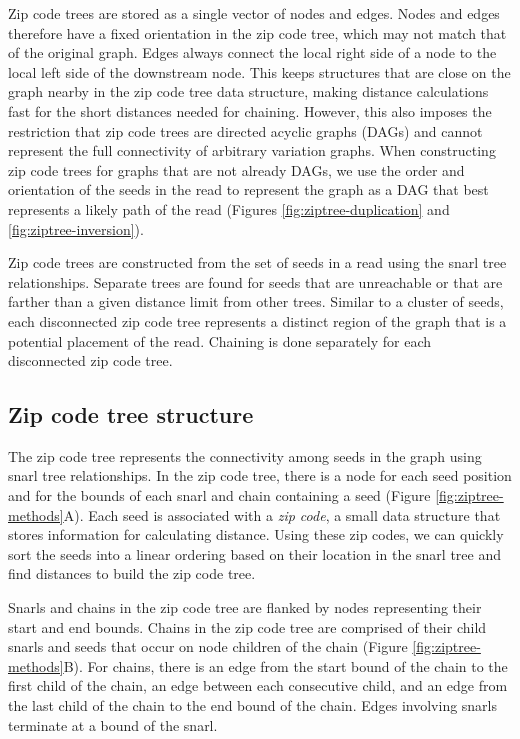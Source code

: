 \documentclass[11pt]{ucscthesis}
\begin{document}
Zip code trees are stored as a single vector of nodes and edges.
Nodes and edges therefore have a fixed orientation in the zip code tree, which may not match that of the original graph.
Edges always connect the local right side of a node to the local left side of the downstream node.
This keeps structures that are close on the graph nearby in the zip code tree data structure, making distance calculations fast for the short distances needed for chaining.
However, this also imposes the restriction that zip code trees are directed acyclic graphs (DAGs) and cannot represent the full connectivity of arbitrary variation graphs.
When constructing zip code trees for graphs that are not already DAGs, we use the order and orientation of the seeds in the read to represent the graph as a DAG that best represents a likely path of the read (Figures  \ref{fig:ziptree-duplication} and \ref{fig:ziptree-inversion}).

Zip code trees are constructed from the set of seeds in a read using the snarl tree relationships.
Separate trees are found for seeds that are unreachable or that are farther than a given distance limit from other trees.
Similar to a cluster of seeds, each disconnected zip code tree represents a distinct region of the graph that is a potential placement of the read.
Chaining is done separately for each disconnected zip code tree.


\subsection{Zip code tree structure}

The zip code tree represents the connectivity among seeds in the graph using snarl tree relationships.
In the zip code tree, there is a node for each seed position and for the bounds of each snarl and chain containing a seed (Figure \ref{fig:ziptree-methods}A).
Each seed is associated with a \emph{zip code}, a small data structure that stores information for calculating distance.
Using these zip codes, we can quickly sort the seeds into a linear ordering based on their location in the snarl tree and find distances to build the zip code tree.

Snarls and chains in the zip code tree are flanked by nodes representing their start and end bounds.
Chains in the zip code tree are comprised of their child snarls and seeds that occur on node children of the chain (Figure \ref{fig:ziptree-methods}B).
For chains, there is an edge from the start bound of the chain to the first child of the chain, an edge between each consecutive child, and an edge from the last child of the chain to the end bound of the chain.
Edges involving snarls terminate at a bound of the snarl.
\end{document}
